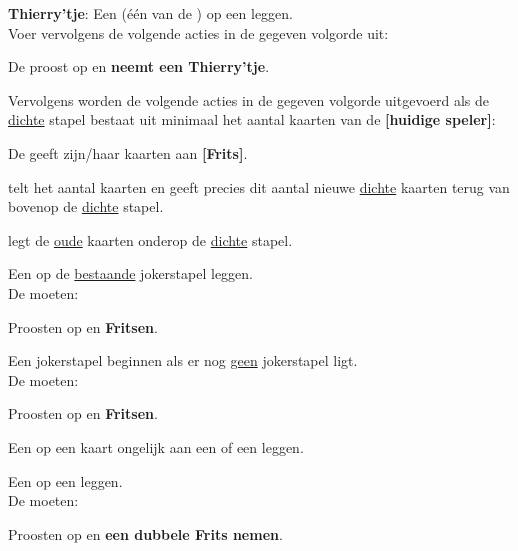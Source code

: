 \vervolgLijst{}
    \item \label{zet:thierry} \textbf{Thierry'tje}: Een  (\'e\'en van de ) op een  leggen. \\Voer vervolgens de volgende acties in de gegeven volgorde uit:
    \puntLijst{}
        \item De \huidigeSpeler proost op  en \textbf{neemt een Thierry'tje}\footnotemark[2].
        \item Vervolgens worden de volgende acties in de gegeven volgorde uitgevoerd als de \ul{dichte} stapel bestaat uit minimaal het aantal kaarten van de \textbf{[huidige speler]}:
        \puntLijst{}
            \item De \huidigeSpeler geeft zijn/haar kaarten aan \textbf{[Frits]}. \
            \item \Frits telt het aantal kaarten en geeft precies dit aantal nieuwe \ul{dichte} kaarten terug van bovenop de \ul{dichte} stapel. 
            \item \Frits legt de \ul{oude} kaarten onderop de \ul{dichte} stapel.
        \eindPuntLijst{}
    \eindPuntLijst{}
    \label{zet:thierry}
\eindLijst{} 

\vervolgLijst{}
    \item \label{zet:joker_1} Een  op de \ul{bestaande} jokerstapel leggen. \\De \andereSpelers moeten:
    \puntLijst{}
        \item Proosten op  en \textbf{Fritsen}.
    \eindPuntLijst{}
\eindLijst{} 

\vervolgLijst{}
    \item \label{zet:joker_2} Een jokerstapel beginnen als er nog \ul{geen} jokerstapel ligt. \\De \andereSpelers moeten:
    \puntLijst{}
        \item Proosten op  en \textbf{Fritsen}.
    \eindPuntLijst{}
\eindLijst{} 

\vervolgLijst{}
    \item Een  op een kaart ongelijk aan een  of een  leggen.
\eindLijst{} 

\vervolgLijst{}
    \item Een  op een  leggen. \\De \andereSpelers moeten:
    \puntLijst{}
        \item Proosten op  en \textbf{een dubbele Frits nemen}.
    \eindPuntLijst{}
\eindLijst{} 




